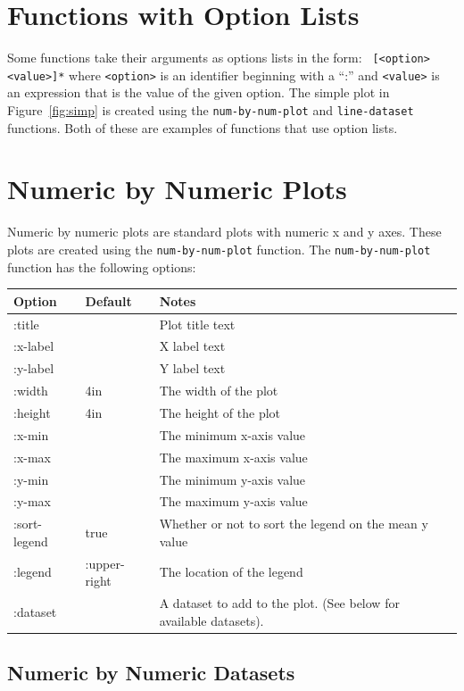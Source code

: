 \documentclass{article}
\begin{document}
\section{Functions with Option Lists}

Some functions take their arguments as options lists in the form: {\tt
  [<option> <value>]*} where {\tt <option>} is an identifier beginning
with a ``:'' and {\tt <value>} is an expression that is the value of
the given option.  The simple plot in Figure~\ref{fig:simp} is created
using the {\tt num-by-num-plot} and {\tt line-dataset} functions.
Both of these are examples of functions that use option lists.

\section{\label{sect:num-by-num} Numeric by Numeric Plots}

Numeric by numeric plots are standard plots with numeric x and y axes.
These plots are created using the {\tt num-by-num-plot} function.  The
{\tt num-by-num-plot} function has the following options:

\begin{center}
\begin{tabular}{lll}
Option & Default & Notes \\
\hline
:title & & Plot title text\\
:x-label & & X label text\\
:y-label & & Y label text\\
:width & 4in & The width of the plot\\
:height & 4in & The height of the plot\\
:x-min & & The minimum x-axis value\\
:x-max & & The maximum x-axis value\\
:y-min & & The minimum y-axis value\\
:y-max & & The maximum y-axis value\\
:sort-legend & true & Whether or not to sort the legend on the mean y
value \\
:legend & :upper-right & The location of the legend \\
:dataset & & A dataset to add to the plot.  (See below for available
datasets).\\
\end{tabular}
\end{center}

\subsection{Numeric by Numeric Datasets}
\end{document}
